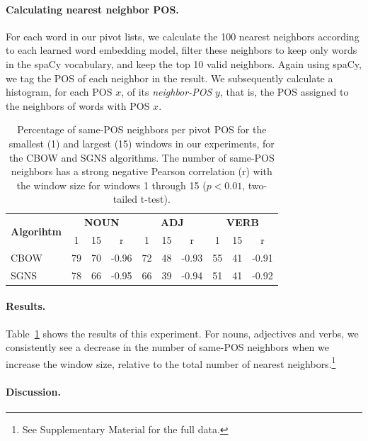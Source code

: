 \documentclass[11pt,a4paper]{article}
\begin{document}
    \paragraph{Calculating nearest neighbor POS.}
    
    For each word in our pivot lists, we calculate the 100 nearest neighbors
    according to each learned word embedding model, filter these neighbors to
    keep only words in the spaCy vocabulary, and keep the top 10 valid neighbors.
    Again using spaCy, we tag the POS of each neighbor in the result.
    We subsequently calculate a histogram, for each POS $x$, of its
    \textit{neighbor-POS} $y$, that is, the POS assigned to the neighbors of
    words with POS $x$.
    
    \begin{table}[t]
    \centering
    \small
    \setlength\tabcolsep{4pt}
    \begin{tabular}{l|ccc|ccc|ccc}
    \multirow{2}{1cm}{\bf Algorihtm}
    & \multicolumn{3}{c|}{\bf NOUN} & \multicolumn{3}{c|}{\bf ADJ} & \multicolumn{3}{c}{\bf VERB} \\
    & 1 & 15 & r & 1 & 15 & r & 1 & 15 & r \\
    \hline
    CBOW & 79 & 70 & -0.96 & 72 & 48 & -0.93 & 55 & 41 & -0.91 \\
    SGNS & 78 & 66 & -0.95 & 66 & 39 & -0.94 & 51 & 41 & -0.92 
    \end{tabular}
    \caption{Percentage of same-POS neighbors per pivot POS for the smallest (1) and largest (15)
        windows in our experiments, for the CBOW and SGNS algorithms.
        The number of same-POS neighbors has a strong negative Pearson correlation (r) with the window size
        for windows 1 through 15 ($p<0.01$, two-tailed t-test).
    \label{tab:nn_pos_hist}}
    \end{table}
    
    \paragraph{Results.}
    
    Table~\ref{tab:nn_pos_hist} shows the results of this experiment.
    For nouns, adjectives and verbs, we consistently see a decrease in
    the  number of same-POS neighbors when we increase the window size,
    relative to the total number of nearest
    neighbors.\footnote{See Supplementary Material for the full data.}
    
    \paragraph{Discussion.}
    
\end{document}
